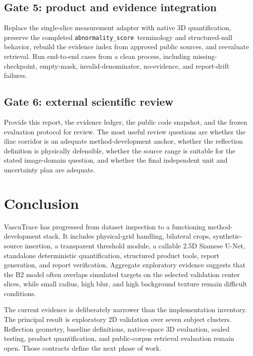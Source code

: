 \documentclass[11pt]{article}
\newcommand{\scoreterm}{\texttt{abnormality\_score}}
\begin{document}
\subsection{Gate 5: product and evidence integration}

Replace the single-slice measurement adapter with native 3D quantification, preserve the completed \scoreterm\ terminology and structured-null behavior, rebuild the evidence index from approved public sources, and reevaluate retrieval. Run end-to-end cases from a clean process, including missing-checkpoint, empty-mask, invalid-denominator, no-evidence, and report-drift failures.

\subsection{Gate 6: external scientific review}

Provide this report, the evidence ledger, the public code snapshot, and the frozen evaluation protocol for review. The most useful review questions are whether the iliac corridor is an adequate method-development anchor, whether the reflection definition is physically defensible, whether the source range is suitable for the stated image-domain question, and whether the final independent unit and uncertainty plan are adequate.

\section{Conclusion}

VascuTrace has progressed from dataset inspection to a functioning method-development stack. It includes physical-grid handling, bilateral crops, synthetic-source insertion, a transparent threshold module, a callable 2.5D Siamese U-Net, standalone deterministic quantification, structured product tools, report generation, and report verification. Aggregate exploratory evidence suggests that the B2 model often overlaps simulated targets on the selected validation center slices, while small radius, high blur, and high background texture remain difficult conditions.

The current evidence is deliberately narrower than the implementation inventory. The principal result is exploratory 2D validation over seven subject clusters. Reflection geometry, baseline definitions, native-space 3D evaluation, sealed testing, product quantification, and public-corpus retrieval evaluation remain open. Those contracts define the next phase of work.
\end{document}
